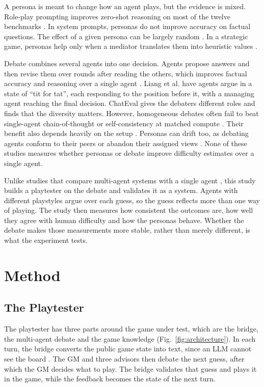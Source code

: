 \documentclass[conference]{IEEEtran}
\begin{document}
A persona is meant to change how an agent plays, but the evidence is mixed. Role-play prompting improves zero-shot reasoning on most of the twelve benchmarks \cite{kong2024}. In system prompts, personas do not improve accuracy on factual questions. The effect of a given persona can be largely random \cite{zheng2024}. In a strategic game, personas help only when a mediator translates them into heuristic values \cite{licato2025}.

Debate combines several agents into one decision. Agents propose answers and then revise them over rounds after reading the others, which improves factual accuracy and reasoning over a single agent \cite{du2024}. Liang et al. \cite{liang2024} have agents argue in a state of ``tit for tat'', each responding to the position before it, with a managing agent reaching the final decision. ChatEval \cite{chan2024} gives the debaters different roles and finds that the diversity matters. However, homogeneous debates often fail to beat single-agent chain-of-thought or self-consistency at matched compute \cite{zhang2025}. Their benefit also depends heavily on the setup \cite{smit2024}. Personas can drift too, as debating agents conform to their peers or abandon their assigned views \cite{baltaji2024}. None of these studies measures whether personas or debate improve difficulty estimates over a single agent.

Unlike studies that compare multi-agent systems with a single agent \cite{sreedhar2025,smit2024}, this study builds a playtester on the debate and validates it as a system. Agents with different playstyles argue over each guess, so the guess reflects more than one way of playing. The study then measures how consistent the outcomes are, how well they agree with human difficulty and how the personas behave. Whether the debate makes those measurements more stable, rather than merely different, is what the experiment tests.

\section{Method}
\label{sec:method}

\subsection{The Playtester}
The playtester has three parts around the game under test, which are the bridge, the multi-agent debate and the game knowledge (Fig.~\ref{fig:architecture}). In each turn, the bridge converts the public game state into text, since an LLM cannot see the board \cite{zhao2025}. The GM and three advisors then debate the next guess, after which the GM decides what to play. The bridge validates that guess and plays it in the game, while the feedback becomes the state of the next turn.
\end{document}
